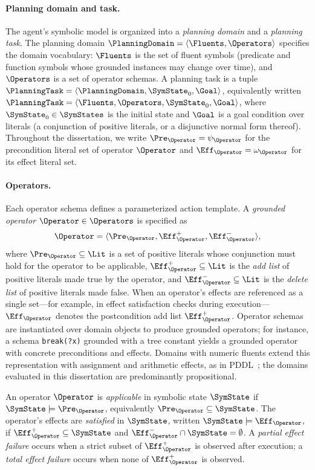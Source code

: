 \paragraph{Planning domain and task.}
The agent's symbolic model is organized into a \emph{planning domain} and a \emph{planning task}. The planning domain $\PlanningDomain = \langle \Fluents, \Operators \rangle$ specifies the domain vocabulary: $\Fluents$ is the set of fluent symbols (predicate and function symbols whose grounded instances may change over time), and $\Operators$ is a set of operator schemas. A planning task is a tuple $\PlanningTask = \langle \PlanningDomain, \SymState_0, \Goal \rangle$, equivalently written $\PlanningTask = \langle \Fluents, \Operators, \SymState_0, \Goal \rangle$, where $\SymState_0 \in \SymStates$ is the initial state and $\Goal$ is a goal condition over literals (a conjunction of positive literals, or a disjunctive normal form thereof). Throughout the dissertation, we write $\Pre_\Operator = \psi_\Operator$ for the precondition literal set of operator $\Operator$ and $\Eff_\Operator = \omega_\Operator$ for its effect literal set.

\paragraph{Operators.}
Each operator schema defines a parameterized action template. A \emph{grounded operator} $\Operator \in \Operators$ is specified as
\[
\Operator = \langle \Pre_\Operator, \Eff_\Operator^+, \Eff_\Operator^- \rangle,
\]
where $\Pre_\Operator \subseteq \Lit$ is a set of positive literals whose conjunction must hold for the operator to be applicable, $\Eff_\Operator^+ \subseteq \Lit$ is the \emph{add list} of positive literals made true by the operator, and $\Eff_\Operator^- \subseteq \Lit$ is the \emph{delete list} of positive literals made false. When an operator's effects are referenced as a single set---for example, in effect satisfaction checks during execution---$\Eff_\Operator$ denotes the postcondition add list $\Eff_\Operator^+$. Operator schemas are instantiated over domain objects to produce grounded operators; for instance, a schema \texttt{break(?x)} grounded with a tree constant yields a grounded operator with concrete preconditions and effects. Domains with numeric fluents extend this representation with assignment and arithmetic effects, as in PDDL~\citep{mcdermott1998pddl}; the domains evaluated in this dissertation are predominantly propositional.

An operator $\Operator$ is \emph{applicable} in symbolic state $\SymState$ if $\SymState \models \Pre_\Operator$, equivalently $\Pre_\Operator \subseteq \SymState$. The operator's effects are \emph{satisfied} in $\SymState$, written $\SymState \models \Eff_\Operator$, if $\Eff_\Operator^+ \subseteq \SymState$ and $\Eff_\Operator^- \cap \SymState = \emptyset$. A \emph{partial effect failure} occurs when a strict subset of $\Eff_\Operator^+$ is observed after execution; a \emph{total effect failure} occurs when none of $\Eff_\Operator^+$ is observed.


